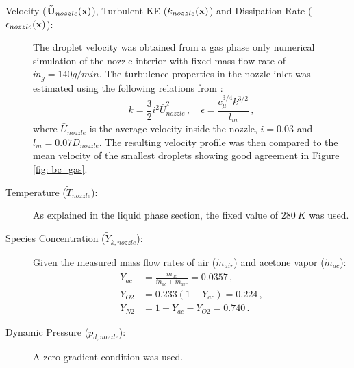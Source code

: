 \begin{description}
  \item[Velocity ($\tilde{\mathbf{U}}_{nozzle}(\mathbf{x})$), Turbulent KE ($k_{nozzle}(\mathbf{x})$) and Dissipation Rate ($\epsilon_{nozzle}(\mathbf{x})$):] The droplet velocity was obtained from a gas phase only numerical simulation of the nozzle interior with fixed mass flow rate of $\dot{m}_g = 140 g/min$. The turbulence properties in the nozzle inlet was estimated using the following relations from \cite{luppes}:
  \begin{equation}
  k=\frac{3}{2} i^2 \bar{U}_{nozzle}^{2}\, , \quad \epsilon = \frac{c_{\mu}^{3/4} k^{3/2}}{l_m} \, ,
  \end{equation}
  where $\bar{U}_{nozzle}$ is the average velocity inside the nozzle, $i=0.03$ and $l_m = 0.07 D_{nozzle}$.
  The resulting velocity profile was then compared to the mean velocity of the smallest droplets showing good agreement in Figure \ref{fig: bc_gas}.
  
  \item[Temperature ($\tilde{T}_{nozzle}$):] As explained in the liquid phase section, the fixed value of $280\ K$ was used.
  \item[Species Concentration ($\tilde{Y}_{k,nozzle}$):] Given the measured mass flow rates of air ($\dot{m}_{air}$) and acetone vapor ($\dot{m}_{ac}$):
  \begin{equation}
  \begin{split}
  Y_{ac} &= \frac{\dot{m}_{ac}}{\dot{m}_{ac}+\dot{m}_{air}}=0.0357 \, , \\
  Y_{O2} &= 0.233\left( 1- Y_{ac} \right)=0.224 \, , \\
  Y_{N2} &= 1- Y_{ac}-Y_{O2}=0.740 \, .
   \end{split}
  \end{equation}
  \item[Dynamic Pressure ($p_{d,nozzle}$):] A zero gradient condition was used.
\end{description}


